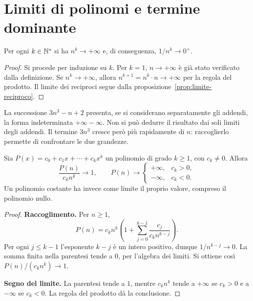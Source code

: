 \section{Limiti di polinomi e termine dominante}
\label{sec:polinomi-limiti}

\begin{proposizione}
Per ogni $k\in\mathbb{N}^*$ si ha $n^k\to+\infty$ e, di conseguenza, $1/n^k\to0^+$.
\end{proposizione}
\begin{proof}
Si procede per induzione su $k$. Per $k=1$, $n\to+\infty$ è già stato verificato dalla definizione. Se $n^k\to+\infty$, allora $n^{k+1}=n^k\cdot n\to+\infty$ per la regola del prodotto. Il limite dei reciproci segue dalla proposizione~\ref{prop:limite-reciproco}.
\end{proof}

\begin{esempio}
La successione $3n^3-n+2$ presenta, se si considerano separatamente gli addendi, la forma indeterminata $+\infty-\infty$. Non si può dedurre il risultato dai soli limiti degli addendi. Il termine $3n^3$ cresce però più rapidamente di $n$: raccoglierlo permette di confrontare le due grandezze.
\end{esempio}

\begin{proposizione}
\label{prop:polinomio-dominante}
Sia $P(x)=c_0+c_1x+\cdots+c_kx^k$ un polinomio di grado $k\ge1$, con $c_k\ne0$. Allora
\[
\frac{P(n)}{c_kn^k}\longrightarrow1,
\qquad
P(n)\longrightarrow
\begin{cases}
+\infty,&c_k>0,\\
-\infty,&c_k<0.
\end{cases}
\]
Un polinomio costante ha invece come limite il proprio valore, compreso il polinomio nullo.
\end{proposizione}
\begin{proof}
\textbf{Raccoglimento.} Per $n\ge1$,
\[
P(n)=c_kn^k\left(1+\sum_{j=0}^{k-1}\frac{c_j}{c_kn^{k-j}}\right).
\]
Per ogni $j\le k-1$ l'esponente $k-j$ è un intero positivo, dunque $1/n^{k-j}\to0$. La somma finita nella parentesi tende a $0$, per l'algebra dei limiti. Si ottiene così $P(n)/(c_kn^k)\to1$.

\textbf{Segno del limite.} La parentesi tende a $1$, mentre $c_kn^k$ tende a $+\infty$ se $c_k>0$ e a $-\infty$ se $c_k<0$. La regola del prodotto dà la conclusione.
\end{proof}

